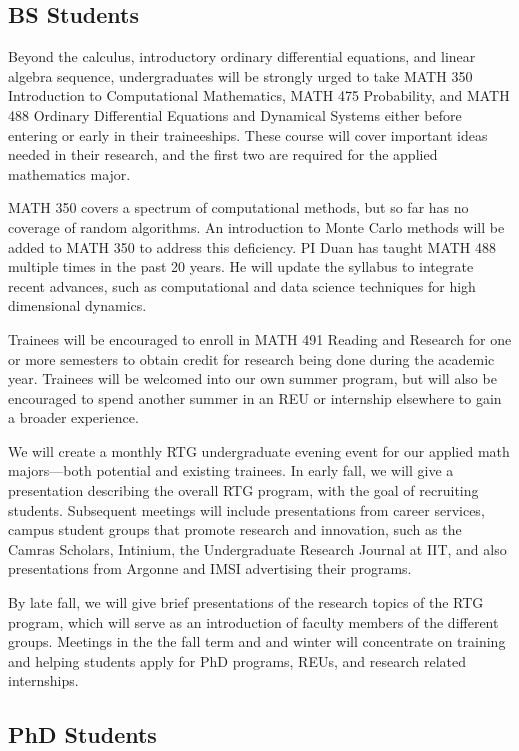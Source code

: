 \documentclass[11pt]{NSFamsart}
\begin{document}
\subsection*{BS Students}

Beyond the calculus, introductory ordinary differential equations, and linear algebra sequence, undergraduates will be strongly urged to take MATH 350 Introduction to Computational Mathematics, MATH 475 Probability, and MATH 488 Ordinary Differential Equations and Dynamical Systems either before entering or early in their traineeships.  These course will cover important ideas needed in their research, and the first two are required for the applied mathematics major.  

MATH 350 covers a spectrum of computational methods, but so far has no coverage of random algorithms. An introduction to Monte Carlo methods will be added to MATH 350 to address this deficiency.
PI Duan has taught MATH 488 multiple  times in the past 20 years.  He will update the syllabus to integrate recent advances, such as computational and data science techniques for high dimensional dynamics. 

Trainees will be encouraged to enroll in MATH 491 Reading and Research for one or more semesters to obtain credit for research being done during the academic year.  Trainees will be welcomed into our own summer program, but will also be encouraged to spend another summer in an REU or internship elsewhere to gain a broader experience.

We will create a monthly RTG undergraduate evening event for our applied math majors---both potential and existing trainees.  In early fall, we will give a presentation describing the overall RTG program, with the goal of recruiting students. Subsequent meetings will include presentations from   career services, campus student groups that promote research and innovation, such as the Camras Scholars, Intinium, the Undergraduate Research Journal at IIT, and also presentations from Argonne and IMSI advertising their programs. 

By late fall, we will give brief presentations of the research topics of the RTG program, which will serve as an introduction of faculty members of the different
groups. Meetings in the the fall term and and winter will concentrate on training and helping students apply for PhD programs, REUs, and research related internships. 



\subsection*{PhD Students}
\end{document}
